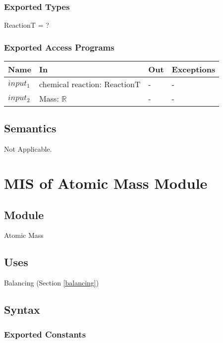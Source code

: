 \documentclass[12pt, titlepage]{article}
\begin{document}
\subsubsection{Exported Types}
ReactionT = ?
\subsubsection{Exported Access Programs}

\begin{center}
\begin{tabular}{p{2cm} p{4cm} p{4cm} p{2cm}}
\hline
\textbf{Name} & \textbf{In} & \textbf{Out} & \textbf{Exceptions} \\
\hline
{$input_1$} & chemical reaction: \newline ReactionT & - & -   \\
{$input_2$} & Mass: $\mathbb{R}$ & - & -   \\
\hline
\end{tabular}
\end{center}

\subsection{Semantics}

Not Applicable.

\newpage

\section{MIS of Atomic Mass Module} \label{Atomic Mass} 

\subsection{Module}

Atomic Mass

\subsection{Uses}

Balancing (Section \ref{balancing})

\subsection{Syntax}

\subsubsection{Exported Constants}
\end{document}

